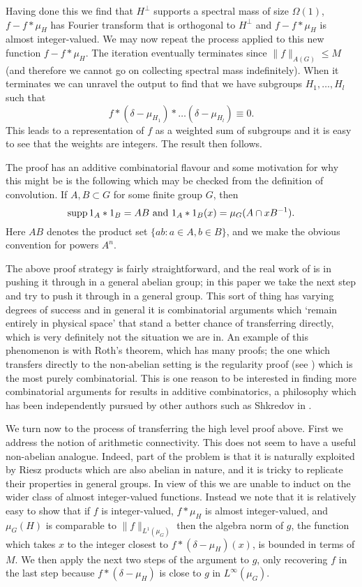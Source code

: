 \documentclass[12pt]{amsart}
\numberwithin{equation}{section}
\theoremstyle{plain}
\theoremstyle{definition}
\renewcommand{\leq}{\leqslant}
\providecommand{\supp}{\mathop{\rm supp}\nolimits}
\begin{document}
Having done this we find that $H^\perp$ supports a spectral mass of size $\Omega(1)$, $f-f\ast \mu_H$ has Fourier transform that is orthogonal to $H^\perp$ and $f-f\ast \mu_H$ is almost integer-valued.  We may now repeat the process applied to this new function $f-f\ast \mu_H$.  The iteration eventually terminates since $\|f\|_{A(G)} \leq M$ (and therefore we cannot go on collecting spectral mass indefinitely).  When it terminates we can unravel the output to find that we have subgroups $H_1,\dots,H_l$ such that
\begin{equation*}
f\ast (\delta - \mu_{H_1}) \ast \dots (\delta-\mu_{H_l}) \equiv 0.
\end{equation*}
This leads to a representation of $f$ as a weighted sum of subgroups and it is easy to see that the weights are integers.  The result then follows.

The proof has an additive combinatorial flavour and some motivation for why this might be is the following which may be checked from the definition of convolution.  If $A,B \subset G$ for some finite group $G$, then
\begin{equation*}
\supp 1_A \ast 1_B = AB \textrm{ and }1_A \ast 1_B(x) = \mu_G(A \cap xB^{-1}).
\end{equation*}
Here $AB$ denotes the product set $\{ab: a \in A, b \in B\}$, and we make the obvious convention for powers $A^n$.

The above proof strategy is fairly straightforward, and the real work of \cite{BJGTS2} is in pushing it through in a general abelian group; in this paper we take the next step and try to push it through in a general group. This sort of thing has varying degrees of success and in general it is combinatorial arguments which `remain entirely in physical space' that stand a better chance of transferring directly, which is very definitely not the situation we are in.  An example of this phenomenon is with Roth's theorem, which has many proofs; the one which transfers directly to the non-abelian setting is the regularity proof (see \cite{DKOSLV}) which is the most purely combinatorial. This is one reason to be interested in finding more combinatorial arguments for results in additive combinatorics, a philosophy which has been independently pursued by other authors such as Shkredov in \cite{IDS1,IDS}.

We turn now to the process of transferring the high level proof above. First we address the notion of arithmetic connectivity.  This does not seem to have a useful non-abelian analogue.  Indeed, part of the problem is that it is naturally exploited by Riesz products which are also abelian in nature, and it is tricky to replicate their properties in general groups.  In view of this we are unable to induct on the wider class of almost integer-valued functions.  Instead we note that it is relatively easy to show that if $f$ is integer-valued, $f \ast \mu_H$ is almost integer-valued, and $\mu_G(H)$ is comparable to $\|f\|_{L^1(\mu_G)}$ then the algebra norm of $g$, the function which takes $x$ to the integer closest to $f \ast (\delta-\mu_H)(x)$, is bounded in terms of $M$.  We then apply the next two steps of the argument to $g$, only recovering $f$ in the last step because $f \ast (\delta-\mu_H)$  is close to $g$ in $L^\infty(\mu_G)$.
\end{document}
